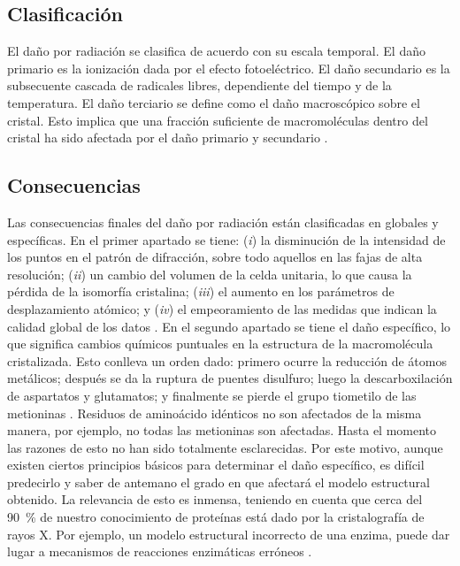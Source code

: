 \subsection{Clasificación}
El daño por radiación se clasifica de acuerdo con su escala temporal. El daño primario es la ionización dada por el efecto fotoeléctrico. El daño secundario es la subsecuente cascada de radicales libres, dependiente del tiempo y de la temperatura. El daño terciario se define como el daño macroscópico sobre el cristal. Esto implica que una fracción suficiente de macromoléculas dentro del cristal ha sido afectada por el daño primario y secundario .
\subsection{Consecuencias}
Las consecuencias finales del daño por radiación están clasificadas en globales y específicas. En el primer apartado se tiene: (\emph{i}) la disminución de la intensidad de los puntos en el patrón de difracción, sobre todo aquellos en las fajas de alta resolución; (\emph{ii}) un cambio del volumen de la celda unitaria, lo que causa la pérdida de la isomorfía cristalina; (\emph{iii}) el aumento en los parámetros de desplazamiento atómico; y (\emph{iv}) el empeoramiento de las medidas que indican la calidad global de los datos \cite{Teng2000}. En el segundo apartado se tiene el daño específico, lo que significa cambios químicos puntuales en la estructura de la macromolécula cristalizada. Esto conlleva un orden dado: primero ocurre la reducción de átomos metálicos; después se da la ruptura de puentes disulfuro; luego la descarboxilación de aspartatos y glutamatos; y finalmente se pierde el grupo tiometilo de las metioninas . Residuos de aminoácido idénticos no son afectados de la misma manera, por ejemplo, no todas las metioninas son afectadas. Hasta el momento las razones de esto no han sido totalmente esclarecidas. Por este motivo, aunque existen ciertos principios básicos para determinar el daño específico, es difícil predecirlo y saber de antemano el grado en que afectará el modelo estructural obtenido. La relevancia de esto es inmensa, teniendo en cuenta que cerca del \SI{90}{\percent} de nuestro conocimiento de proteínas está dado por la cristalografía de rayos X. Por ejemplo, un modelo estructural incorrecto de una enzima, puede dar lugar a mecanismos de reacciones enzimáticas erróneos .  %

